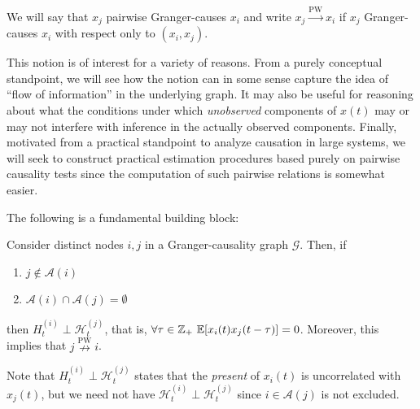 \documentclass[12pt]{article}
\def\pwgc{\overset{\text{PW}}{\rightarrow}}  %
\def\npwgc{\overset{\text{PW}}{\nrightarrow}}  %
\def\gcg{\mathcal{G}}  %
\def\H{\mathcal{H}}  %
\newcommand{\anc}[1]{\mathcal{A}(#1)}  %
\begin{document}
\begin{definition}
  We will say that $x_j$ pairwise Granger-causes $x_i$ and write
  $x_j \pwgc x_i$ if $x_j$ Granger-causes $x_i$ with respect only to
  $(x_i, x_j)$.
\end{definition}

This notion is of interest for a variety of reasons.  From a purely
conceptual standpoint, we will see how the notion can in some sense
capture the idea of ``flow of information'' in the underlying graph.
It may also be useful for reasoning about what the conditions under
which \textit{unobserved} components of $x(t)$ may or may not
interfere with inference in the actually observed components.
Finally, motivated from a practical standpoint to analyze causation in
large systems, we will seek to construct practical estimation
procedures based purely on pairwise causality tests since the
computation of such pairwise relations is somewhat easier.

The following is a fundamental building block:

\begin{lemma}
  \label{lem:ancestor_uncorrelated}
  Consider distinct nodes $i, j$ in a Granger-causality graph
  $\gcg$.  Then, if

  \begin{enumerate}[label=(\alph*)]
    \item{$j \not\in \anc{i}$}
    \item{$\anc{i}\cap\anc{j} = \emptyset$}
  \end{enumerate}

  then $H_t^{(i)} \perp \H_t^{(j)}$, that is,
  $\forall \tau \in \Z_+\ \E[x_i(t)x_j(t - \tau)] = 0$.  Moreover,
  this implies that $j \npwgc i$.
\end{lemma}

\begin{remark}
  Note that $H_t^{(i)} \perp \H_t^{(j)}$ states that the
  \textit{present} of $x_i(t)$ is uncorrelated with $x_j(t)$,
  but we need not have $\H_t^{(i)} \perp \H_t^{(j)}$ since
  $i \in \anc{j}$ is not excluded.
\end{remark}
\end{document}
